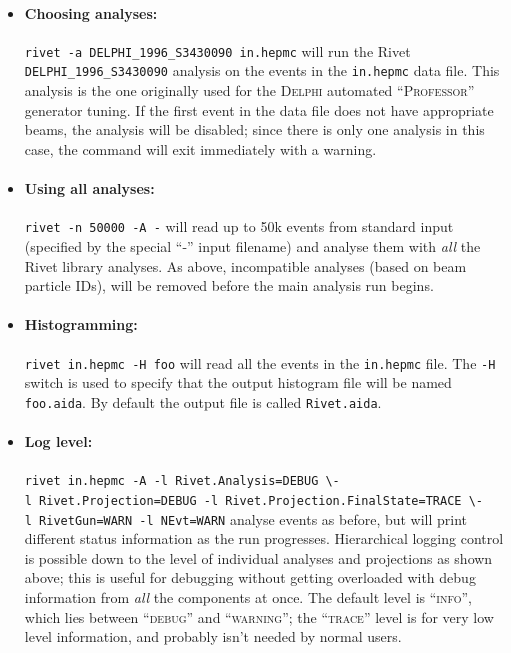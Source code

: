 \documentclass{JHEP3}
\newcommand{\kbd}[1]{\texttt{#1}\xspace}
\newcommand{\Delphi}{\textsc{Delphi}\xspace}
\newcommand{\cmdbreak}{\textbackslash\newline}
\begin{document}
\begin{itemize}

\item \paragraph{Choosing analyses:}{\kbd{rivet -a~DELPHI_1996_S3430090
      in.hepmc} will run the Rivet \kbd{DELPHI_1996_S3430090}\cite{Abreu:1996na}
    analysis on the events in the \kbd{in.hepmc} data file. This analysis is the
    one originally used for the \Delphi automated ``\textsc{Professor}''
    generator tuning.  If the first event in the data file does not have
    appropriate beams, the analysis will be disabled; since there is only one
    analysis in this case, the command will exit immediately with a warning.}

\item \paragraph{Using all analyses:}{\kbd{rivet -n~50000 -A -} will read up to 
    50k events from standard input (specified by the special ``-'' input filename) 
    and analyse them with \emph{all} the Rivet library analyses. As above, 
    incompatible analyses (based on beam particle IDs), will be removed before 
    the main analysis run begins.}

\item \paragraph{Histogramming:}{\kbd{rivet in.hepmc -H~foo} will read all the
    events in the \kbd{in.hepmc} file. The \kbd{-H} switch is used to specify
    that the output histogram file will be named \kbd{foo.aida}. By default the
    output file is called \kbd{Rivet.aida}.}

\item \paragraph{Log level:}{\kbd{rivet in.hepmc -A
      -l~Rivet.Analysis=DEBUG~\cmdbreak -l~Rivet.Projection=DEBUG
      -l~Rivet.Projection.FinalState=TRACE~\cmdbreak -l~RivetGun=WARN
      -l~NEvt=WARN} analyse events as before, but will print different status
    information as the run progresses. Hierarchical logging control is possible
    down to the level of individual analyses and projections as shown above;
    this is useful for debugging without getting overloaded with debug
    information from \emph{all} the components at once. The default level is
    ``\textsc{info}'', which lies between ``\textsc{debug}'' and
    ``\textsc{warning}''; the ``\textsc{trace}'' level is for very low level
    information, and probably isn't needed by normal users.}

\end{itemize}
\end{document}
